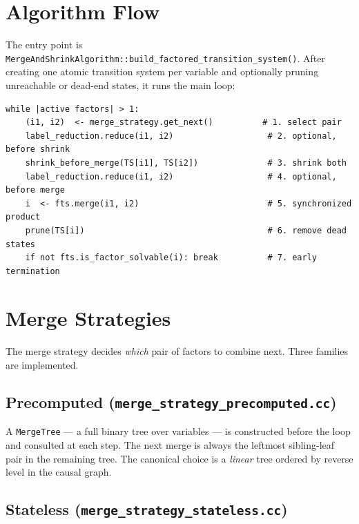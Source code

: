 \documentclass[11pt,a4paper]{article}
\begin{document}
\section{Algorithm Flow}

The entry point is \texttt{MergeAndShrinkAlgorithm::build\_factored\_transition\_system()}.
After creating one atomic transition system per variable and optionally pruning
unreachable or dead-end states, it runs the main loop:

\begin{lstlisting}[caption={Main loop pseudocode}]
while |active factors| > 1:
    (i1, i2)  <- merge_strategy.get_next()          # 1. select pair
    label_reduction.reduce(i1, i2)                   # 2. optional, before shrink
    shrink_before_merge(TS[i1], TS[i2])              # 3. shrink both
    label_reduction.reduce(i1, i2)                   # 4. optional, before merge
    i  <- fts.merge(i1, i2)                          # 5. synchronized product
    prune(TS[i])                                     # 6. remove dead states
    if not fts.is_factor_solvable(i): break          # 7. early termination
\end{lstlisting}

\section{Merge Strategies}

The merge strategy decides \emph{which} pair of factors to combine next.
Three families are implemented.

\subsection{Precomputed (\texttt{merge\_strategy\_precomputed.cc})}

A \texttt{MergeTree} --- a full binary tree over variables --- is constructed
before the loop and consulted at each step.  The next merge is always the
leftmost sibling-leaf pair in the remaining tree.  The canonical choice is a
\emph{linear} tree ordered by reverse level in the causal graph.

\subsection{Stateless (\texttt{merge\_strategy\_stateless.cc})}
\end{document}

